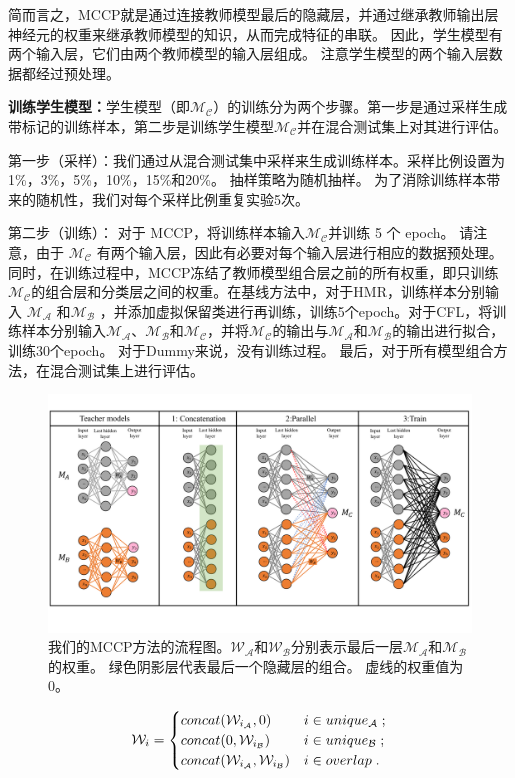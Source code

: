 \documentclass[fontset=macnew,UTF8]{article} %
\begin{document}
简而言之，MCCP就是通过连接教师模型最后的隐藏层，并通过继承教师输出层神经元的权重来继承教师模型的知识，从而完成特征的串联。 因此，学生模型有两个输入层，它们由两个教师模型的输入层组成。 注意学生模型的两个输入层数据都经过预处理。

\textbf{训练学生模型：}学生模型（即$\mathcal{M_C}$）的训练分为两个步骤。第一步是通过采样生成带标记的训练样本，第二步是训练学生模型$\mathcal{M_C}$并在混合测试集上对其进行评估。

第一步（采样）：我们通过从混合测试集中采样来生成训练样本。采样比例设置为1\%，3\%，5\%，10\%，15\%和20\%\cite{shen2020multiple}。 抽样策略为随机抽样。 为了消除训练样本带来的随机性，我们对每个采样比例重复实验5次。

第二步（训练）： 对于 MCCP，将训练样本输入$\mathcal{M_C}$并训练 5 个 epoch。 请注意，由于 $\mathcal{M_C}$ 有两个输入层，因此有必要对每个输入层进行相应的数据预处理。 同时，在训练过程中，MCCP冻结了教师模型组合层之前的所有权重，即只训练$\mathcal{M_C}$的组合层和分类层之间的权重。在基线方法中，对于HMR，训练样本分别输入 $\mathcal{M_A}$ 和$\mathcal{M_B}$ ，并添加虚拟保留类进行再训练，训练5个epoch。对于CFL，将训练样本分别输入$\mathcal{M_A}$、$\mathcal{M_B}$和$\mathcal{M_C}$，并将$\mathcal{M_C}$的输出与$\mathcal{M_A}$和$\mathcal{M_B}$的输出进行拟合，训练30个epoch。 对于Dummy来说，没有训练过程。 最后，对于所有模型组合方法，在混合测试集上进行评估。
\begin{figure}[t]
	\centering
	\includegraphics[scale=0.4]{MCCP_method.pdf}
	\caption{我们的MCCP方法的流程图。$\mathcal{W_A}$和$\mathcal{W_B}$分别表示最后一层$\mathcal{M_A}$和$\mathcal{M_B}$的权重。 绿色阴影层代表最后一个隐藏层的组合。 虚线的权重值为 0。}	
	\label{MCCP_method}
\end{figure}

\begin{equation}
	\label{weightFormula}
	\mathcal{W}_i = 
	\begin{cases}
		\hfil concat(\mathcal{W}_{i_\mathcal{A}},0) &  i \in unique_\mathcal{A} \;;\\
		\hfil concat(0,\mathcal{W}_{i_\mathcal{B}}) &  i \in unique_\mathcal{B} \;;\\
		concat(\mathcal{W}_{i_\mathcal{A}},\mathcal{W}_{i_\mathcal{B}}) &  i \in overlap \;.
	\end{cases}
\end{equation}
\end{document}
